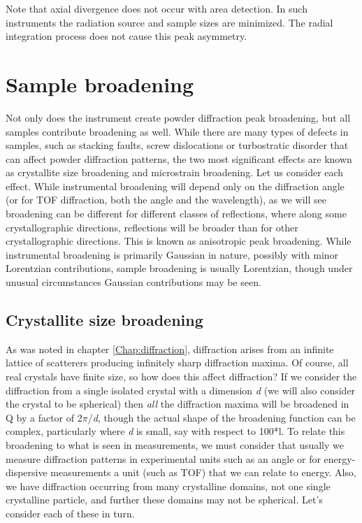  Note that axial divergence does not occur with area detection. In such instruments the radiation source and sample sizes are minimized. The radial integration process does not cause this peak asymmetry. 

 

\section{Sample broadening}

Not only does the instrument create powder diffraction peak broadening, but all samples contribute broadening as well. While there are many types of defects in samples, such as stacking faults, screw dislocations or turbostratic disorder that can affect powder diffraction patterns, the two most significant effects are known as crystallite size broadening and microstrain broadening. Let us consider each effect. While instrumental broadening will depend only on the diffraction angle (or for TOF diffraction, both the angle and the wavelength), as we will see broadening can be different for different classes of reflections, where along some crystallographic directions, reflections will be broader than for other crystallographic directions. This is known as anisotropic peak broadening. While instrumental broadening is primarily Gaussian in nature, possibly with minor Lorentzian contributions, sample broadening is usually Lorentzian, though under unusual circumstances Gaussian contributions may be seen. 

 

\subsection{Crystallite size broadening}

As was noted in chapter \ref{Chap:diffraction}, diffraction arises from an infinite lattice of scatterers producing infinitely sharp diffraction maxima. Of course, all real crystals have finite size, so how does this affect diffraction? If we consider the diffraction from a single isolated crystal with a dimension \textit{d} (we will also consider the crystal to be spherical) then \textit{all} the diffraction maxima will be broadened in Q by a factor of 2$\pi$/\textit{d}, though the actual shape of the broadening function can be complex, particularly where \textit{d} is small, say with respect to 100*l. To relate this broadening to what is seen in measurements, we must consider that usually we measure diffraction patterns in experimental units such as an angle or for energy-dispersive measurements a unit (such as TOF) that we can relate to energy. Also, we have diffraction occurring from many crystalline domains, not one single crystalline particle, and further these domains may not be spherical. Let's consider each of these in turn.

